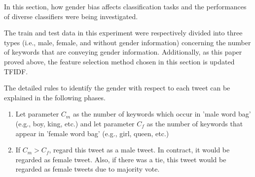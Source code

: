 \documentclass[11pt]{article}
\begin{document}
In this section, how gender bias affects classification tasks and the performances of diverse classifiers were being investigated.

The train and test data in this experiment were respectively divided into three types (i.e., male, female, and without gender information) concerning the number of keywords that are conveying gender information. Additionally, as this paper proved above, the feature selection method chosen in this section is updated TFIDF.

The detailed rules to identify the gender with respect to each tweet can be explained in the following phases.
\begin{enumerate}
\item Let parameter $C_m$ as the number of keywords which occur in 'male word bag' (e.g., boy, king, etc.) and let parameter $C_f$ as the number of keywords that appear in 'female word bag' (e.g., girl, queen, etc.)
\item If $C_m$$ >$$C_f$, regard this tweet as a male tweet. In contract, it would be regarded as female tweet. Also, if there was a tie, this tweet would be regarded as female tweets due to majority vote.
\end{enumerate}
\end{document}
